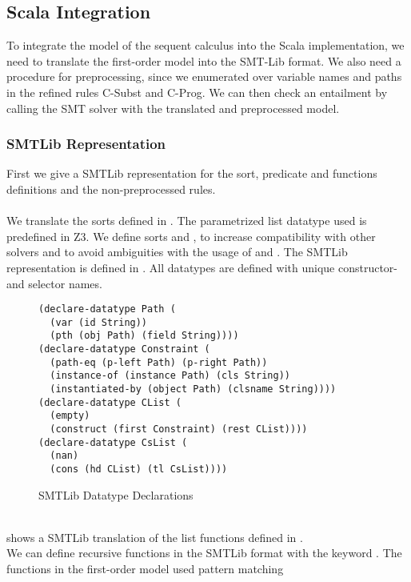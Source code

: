 \subsection{Scala Integration}
To integrate the model of the sequent calculus
into the Scala implementation, we need to translate the
first-order model into the SMT-Lib format.
We also need a procedure for preprocessing,
since we enumerated over variable names and paths
in the refined rules C-Subst and C-Prog.
We can then check an entailment by calling the SMT solver
with the translated and preprocessed model.

\subsubsection{SMTLib Representation}
First we give a SMTLib representation for
the sort, predicate and functions definitions
and the non-preprocessed rules.\\
\\
We translate the sorts defined in .
The parametrized list datatype used is predefined in Z3.
We define sorts  and ,
to increase compatibility with other solvers
and to avoid ambiguities with the usage of \Constrs and \Constrss.
The SMTLib representation is defined in .
All datatypes are defined with unique constructor- and selector names.
%
\begin{figure}[h]
\begin{lstlisting}[language=smtlib]
(declare-datatype Path (
  (var (id String))
  (pth (obj Path) (field String))))
(declare-datatype Constraint (
  (path-eq (p-left Path) (p-right Path))
  (instance-of (instance Path) (cls String))
  (instantiated-by (object Path) (clsname String))))
(declare-datatype CList (
  (empty)
  (construct (first Constraint) (rest CList))))
(declare-datatype CsList (
  (nan)
  (cons (hd CList) (tl CsList))))
\end{lstlisting}
\caption{SMTLib Datatype Declarations}
\label{fig:smtlib-sorts}
\end{figure}\\
%
 shows a SMTLib translation
of the list functions defined in .\\
We can define recursive functions in the SMTLib format
with the keyword .
The functions in the first-order model used pattern matching
